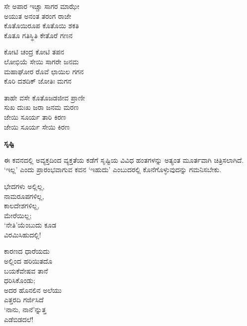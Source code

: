 
\begin{myquote}
ಸೇ ಅಪಾರ ಇಚ್ಚಾ ಸಾಗರ ಮಾಝೇ\\ಅಯುತ ಅನಂತ ತರಂಗ ರಾಜೇ\\ಕೊತೊಯಿರೂಪ ಕೊತೊಯಿ ಶಕತಿ\\ಕೊತೂ ಗತಿಸ್ಥಿತಿ ಕೇತೊರೆ ಗಣನ
\end{myquote}


\begin{myquote}
ಕೋಟಿ ಚಂದ್ರ ಕೋಟಿ ತಪನ\\ಲೋಭಿಯೆ ಸೇಯಿ ಸಾಗರೇ ಜನಮ\\ಮಹಾಘೋರ ರೊವೆ ಛಾಯಿಲ ಗಗನ\\ಕೊರಿ ದಶದಿಕ್ ಜೋತಿಃ ಮಗನ
\end{myquote}


\begin{myquote}
ತಾಹೇ ವಸೇ ಕೊತೊಜಡಜೀವ ಪ್ರಾಣೀ\\ಸುಖ ದುಃಖ ಜರಾ ಜನಮ ಮರಣ\\ಜೇಯಿ ಸೂರ್ಯ ತಾರಿ ಕಿರಣ\\ಜೇಯಿ ಸೂರ್ಯ ಸೇಯಿ ಕಿರಣ
\end{myquote}


\begin{center}
\textbf{ಸೃಷ್ಟಿ}
\end{center}

ಈ ಕವನದಲ್ಲಿ ಅವ್ಯಕ್ತದಿಂದ ವ್ಯಕ್ತತೆಯ ಕಡೆಗೆ ಸೃಷ್ಟಿಯ ವಿವಿಧ ಹಂತಗಳನ್ನು ಅತ್ಯಂತ ಮೂರ್ತವಾಗಿ ಚಿತ್ರಿಸಲಾಗಿದೆ. ‘ಇಲ್ಲ’ ಎಂದು ಪ್ರಾರಂಭವಾಗುವ ಕವನ ‘ಇಹುದು’ ಎಂಬುದರಲ್ಲಿ ಕೊನೆಗೊಳ್ಳುವುದನ್ನು ಗಮನಿಸಬೇಕು.

\begin{myquote}
ಭೇದಗಳು ಅಲ್ಲಿಲ್ಲ,\\ನಾಮರೂಪಗಳಿಲ್ಲ,\\ಕಾಲದೇಶಗಳಿಲ್ಲ,\\ಮೇರೆಯಿಲ್ಲ;\\‘ನೇತಿ’ಯೆಂಬುದು ಕೂಡ\\ವಿರಮಿಸಿಹುದಲ್ಲಿ!
\end{myquote}

\begin{myquote}
ಕಾರಣದ ಧಾರೆಯದು\\ಅಲ್ಲಿಂದ ಹರಿಯಿತದೊ\\ಬಯಕೆವೇಷವ ತಾನೆ\\ಧರಿಸಿಕೊಂಡು;\\ಅದರ ಹೊನಲಿನ ಅಲೆಯು\\ಎತ್ತರದಿ ಗರ್ಜಿಸಿದೆ\\‘ನಾನು, ನಾನೆ’ನ್ನುತ್ತ\\ಎಡೆಬಿಡದಲೆ!
\end{myquote}

